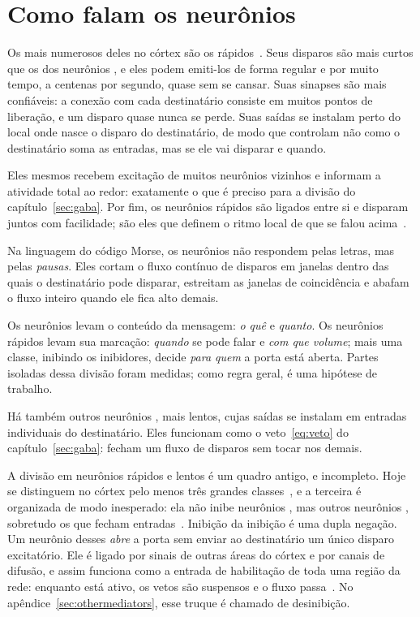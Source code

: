 \section{Como falam os neurônios }

Os mais numerosos deles no córtex são os rápidos~\cite{Tremblay2016}. Seus disparos são mais curtos que os dos neurônios , e eles podem emiti-los de forma regular e por muito tempo, a centenas por segundo, quase sem se cansar. Suas sinapses são mais confiáveis: a conexão com cada destinatário consiste em muitos pontos de liberação, e um disparo quase nunca se perde. Suas saídas se instalam perto do local onde nasce o disparo do destinatário, de modo que controlam não como o destinatário soma as entradas, mas se ele vai disparar e quando.

Eles mesmos recebem excitação de muitos neurônios  vizinhos e informam a atividade total ao redor: exatamente o que é preciso para a divisão do capítulo~\ref{sec:gaba}. Por fim, os neurônios  rápidos são ligados entre si e disparam juntos com facilidade; são eles que definem o ritmo local de que se falou acima~\cite{Cardin2009}.

Na linguagem do código Morse, os neurônios  não respondem pelas letras, mas pelas \emph{pausas}. Eles cortam o fluxo contínuo de disparos  em janelas dentro das quais o destinatário pode disparar, estreitam as janelas de coincidência e abafam o fluxo inteiro quando ele fica alto demais.

\begin{keyblock}
\begin{proposition}
\label{prop:punctuation}
Os neurônios  levam o conteúdo da mensagem: \emph{o quê} e \emph{quanto}. Os neurônios  rápidos levam sua marcação: \emph{quando} se pode falar e \emph{com que volume}; mais uma classe, inibindo os inibidores, decide \emph{para quem} a porta está aberta. Partes isoladas dessa divisão foram medidas; como regra geral, é uma hipótese de trabalho.
\end{proposition}
\end{keyblock}

Há também outros neurônios , mais lentos, cujas saídas se instalam em entradas individuais do destinatário. Eles funcionam como o veto~\eqref{eq:veto} do capítulo~\ref{sec:gaba}: fecham um fluxo de disparos  sem tocar nos demais.

A divisão em neurônios  rápidos e lentos é um quadro antigo, e incompleto. Hoje se distinguem no córtex pelo menos três grandes classes~\cite{Tremblay2016}, e a terceira é organizada de modo inesperado: ela não inibe neurônios , mas outros neurônios , sobretudo os que fecham entradas~\cite{Pfeffer2013}. Inibição da inibição é uma dupla negação. Um neurônio desses \emph{abre} a porta sem enviar ao destinatário um único disparo excitatório. Ele é ligado por sinais de outras áreas do córtex e por canais de difusão, e assim funciona como a entrada de habilitação de toda uma região da rede: enquanto está ativo, os vetos são suspensos e o fluxo passa~\cite{Pi2013}. No apêndice~\ref{sec:othermediators}, esse truque é chamado de desinibição.

